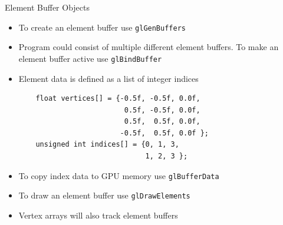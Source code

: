 \documentclass{beamer}
\begin{document}
\begin{frame}[fragile]{Element Buffer Objects}
    \begin{itemize}
        \item To create an element buffer use {\color{blue}\verb"glGenBuffers"}
        \item Program could consist of multiple different element buffers. To make an element buffer active use
                  {\color{blue}\verb"glBindBuffer"}
        \item Element data is defined as a list of integer indices
              \begin{verbatim}
    float vertices[] = {-0.5f, -0.5f, 0.0f,
                         0.5f, -0.5f, 0.0f,
                         0.5f,  0.5f, 0.0f,
                        -0.5f,  0.5f, 0.0f };
    unsigned int indices[] = {0, 1, 3,
                              1, 2, 3 };
 \end{verbatim}
        \item To copy index data to GPU memory use {\color{blue}\verb"glBufferData"}
        \item To draw an element buffer use {\color{blue}\verb"glDrawElements"}
        \item Vertex arrays will also track element buffers
    \end{itemize}
\end{frame}
\end{document}
